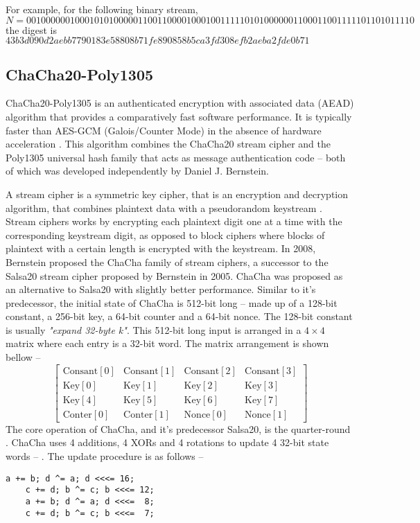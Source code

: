 \documentclass{article}
\begin{document}
For example, for the following binary stream, \[N=00100000010001010100000110011000010001001111101010000001100011001111101101011110\]
the digest is $43b3d090d2aebb7790183e58808b71fe890858b5ca3fd308efb2aeba2fde0b71$
\subsection{ChaCha20-Poly1305}
\label{sec:chacha20}
ChaCha20-Poly1305 is an authenticated encryption with associated data (AEAD) algorithm that provides a comparatively fast software performance. It is typically faster than AES-GCM (Galois/Counter Mode) in the absence of hardware acceleration \cite{rfc7539}. This algorithm combines the ChaCha20 stream cipher \cite{bernstein2008chacha} and the Poly1305 \cite{bernstein2005poly1305} universal hash family that acts as message authentication code -- both of which was developed independently by Daniel J. Bernstein.

A stream cipher is a symmetric key cipher, that is an encryption and decryption algorithm, that combines plaintext data with a pseudorandom keystream \cite{robshaw1995stream}. Stream ciphers works by encrypting each plaintext digit one at a time with the corresponding keystream digit, as opposed to block ciphers where blocks of plaintext with a certain length is encrypted with the keystream. In 2008, Bernstein proposed the ChaCha family of stream ciphers, a successor to the Salsa20 stream cipher \cite{bernstein2005salsa20} proposed by Bernstein in 2005. ChaCha was proposed as an alternative to Salsa20 \cite{bernstein2008chachaFamily} with slightly better performance. Similar to it's predecessor, the initial state of ChaCha is 512-bit long -- made up of a 128-bit constant, a 256-bit key, a 64-bit counter and a 64-bit nonce. The 128-bit constant is usually \textit{"expand 32-byte k"}. This 512-bit long input is arranged in a $4\times4$ matrix where each entry is a 32-bit word. The matrix arrangement is shown bellow --
\begin{equation}\label{initialState}
    \left[
        \begin{array}{cccc}
            \text{Consant}[0] & \text{Consant}[1] & \text{Consant}[2] & \text{Consant}[3] \\
            \text{Key}[0]     & \text{Key}[1]     & \text{Key}[2]     & \text{Key}[3]     \\
            \text{Key}[4]     & \text{Key}[5]     & \text{Key}[6]     & \text{Key}[7]     \\
            \text{Conter}[0]  & \text{Conter}[1]  & \text{Nonce}[0]   & \text{Nonce}[1]
        \end{array}
        \right]
\end{equation}
The core operation of ChaCha, and it's predecessor Salsa20, is the quarter-round . ChaCha uses 4 additions, 4 XORs and 4 rotations to update 4 32-bit state words -- . The update procedure is as follows --
\begin{lstlisting}[basicstyle=\ttfamily,frame=none]
    a += b; d ^= a; d <<<= 16;
    c += d; b ^= c; b <<<= 12;
    a += b; d ^= a; d <<<=  8;
    c += d; b ^= c; b <<<=  7;
\end{lstlisting}
\end{document}
